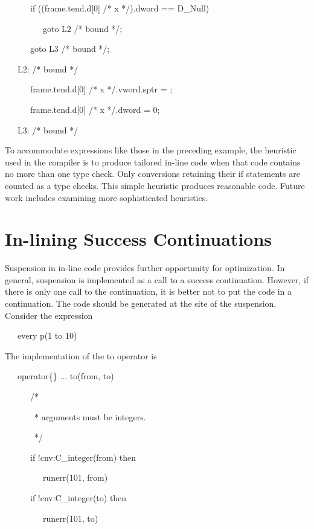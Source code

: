 {\ttfamily\mdseries
\ \ \ \ \ \ if ((frame.tend.d[0] /* x */).dword == D\_Null)}

{\ttfamily\mdseries
\ \ \ \ \ \ \ \ \ goto L2 /* bound */;}

{\ttfamily\mdseries
\ \ \ \ \ \ goto L3 /* bound */;}

{\ttfamily\mdseries
\ \ \ L2: /* bound */}

{\ttfamily\mdseries
\ \ \ \ \ \ frame.tend.d[0] /* x */.vword.sptr = ;}

{\ttfamily\mdseries
\ \ \ \ \ \ frame.tend.d[0] /* x */.dword = 0;}

{\ttfamily\mdseries
\ \ \ L3: /* bound */}


To accommodate expressions like those in the preceding example, the
heuristic used in the compiler is to produce tailored in-line code
when that code contains no more than one type check. Only conversions
retaining their if statements are counted as a type checks. This
simple heuristic produces reasonable code. Future work includes
examining more sophisticated heuristics.


\section{In-lining Success Continuations}

Suspension in in-line code provides further opportunity for
optimization. In general, suspension is implemented as a call to a
success continuation. However, if there is only one call to the
continuation, it is better not to put the code in a continuation. The
code should be generated at the site of the suspension. Consider the
expression

{\ttfamily\mdseries
\ \ \ every p(1 to 10)}


The implementation of the to operator is 

{\ttfamily\mdseries
\ \ \ operator\{\} ... to(from, to)}

{\ttfamily\mdseries
\ \ \ \ \ \ /*}

{\ttfamily\mdseries
\ \ \ \ \ \ \ * arguments must be integers.}

{\ttfamily\mdseries
\ \ \ \ \ \ \ */}

{\ttfamily\mdseries
\ \ \ \ \ \ if !cnv:C\_integer(from) then}

{\ttfamily\mdseries
\ \ \ \ \ \ \ \ \ runerr(101, from)}

{\ttfamily\mdseries
\ \ \ \ \ \ if !cnv:C\_integer(to) then}

{\ttfamily\mdseries
\ \ \ \ \ \ \ \ \ runerr(101, to)}

